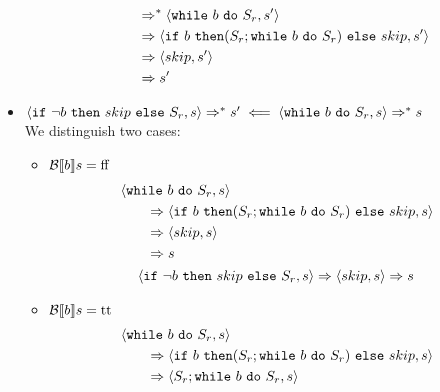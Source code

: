\begin{exercise}
\begin{itemize}
\begin{itemize}
\begin{align*}
                    \\&\qquad\Rightarrow^* \instr{\texttt{while}\ b\ \texttt{do}\ S_r}{s'}
                    \\&\qquad\Rightarrow \instr{\texttt{if}\ b\ \texttt{then} (S_r; \texttt{while}\ b\ \texttt{do}\ S_r)\ \texttt{else}\ skip}{s'}
                    \\&\qquad\Rightarrow \instr{skip}{s'}
                    \\&\qquad\Rightarrow s'
                \end{align*}
            \end{itemize}
        \item $\instr{\texttt{if}\ \neg b\ \texttt{then}\ skip\ \texttt{else}\ S_r}{s} \Rightarrow^* s' \impliedby \instr{\texttt{while}\ b\ \texttt{do}\ S_r}{s} \Rightarrow^* s$ \\
            We distinguish two cases:\begin{itemize}
                \item $\mathcal{B} \llbracket  b \rrbracket s = \text{ff}$
                \begin{gather*}
                    \begin{align*}
                        &\instr{\texttt{while}\ b\ \texttt{do}\ S_r}{s}
                        \\&\qquad\Rightarrow \instr{\texttt{if}\ b\ \texttt{then} (S_r; \texttt{while}\ b\ \texttt{do}\ S_r)\ \texttt{else}\ skip}{s}
                        \\&\qquad\Rightarrow \instr{skip}{s}
                        \\&\qquad\Rightarrow s
                    \end{align*}
                    \\
                    \instr{\texttt{if}\ \neg b\ \texttt{then}\ skip\ \texttt{else}\ S_r}{s}
                    \Rightarrow
                    \instr{skip}{s}
                    \Rightarrow s
                \end{gather*}
                \item $\mathcal{B} \llbracket  b \rrbracket s = \text{tt}$
                \begin{align*}
                    &\instr{\texttt{while}\ b\ \texttt{do}\ S_r}{s}
                    \\&\qquad\Rightarrow \instr{\texttt{if}\ b\ \texttt{then} (S_r; \texttt{while}\ b\ \texttt{do}\ S_r)\ \texttt{else}\ skip}{s}
                    \\&\qquad\Rightarrow \instr{S_r; \texttt{while}\ b\ \texttt{do}\ S_r}{s}

\end{align*}
\end{itemize}
\end{itemize}
\end{exercise}
